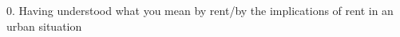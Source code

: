 






0. Having understood what you mean by rent/by the implications of rent in an urban situation

